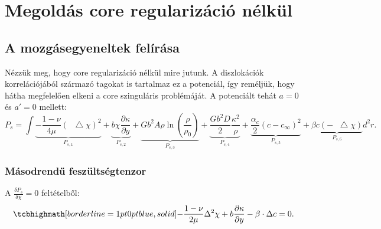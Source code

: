 \documentclass[10pt,a4paper]{scrartcl}
\newcommand*\Laplace{\mathop{}\!\mathbin\bigtriangleup}
\begin{document}
\section{Megoldás core regularizáció nélkül}
\subsection{A mozgásegyeneltek felírása}
Nézzük meg, hogy core regularizáció nélkül mire jutunk. A diszlokációk korrelációjából származó tagokat is tartalmaz ez a potenciál, így reméljük, hogy hátha megfelelően elkeni a core szinguláris problémáját. A potenciált tehát $a=0$ és $a'=0$ mellett:
\begin{equation} \label{eq:plastic_pot_wo_core_reg}
P_s = \int { \underbrace{- \frac{{1 - \nu }}{{4\mu }}{{\left( {\Laplace\chi } \right)}^2}}_{P_{s,1}} + \underbrace{b\chi \frac{{\partial \kappa }}{{\partial y}}}_{P_{s,2}} + \underbrace{G{b^2}A\rho \ln \left( {\frac{\rho }{{{\rho _0}}}} \right)}_{P_{s,3}} + \underbrace{\frac{{G{b^2}D}}{2}\frac{{{\kappa ^2}}}{\rho }}_{P_{s,4}} + \underbrace{\frac{\alpha_c}{2} {\left( {c - {c_\infty }} \right)^2}}_{P_{s,5}} + \underbrace{\beta c\left(- {\Laplace\chi } \right)}_{P_{s,6}}}{d^2}r.
\end{equation}
\subsubsection{Másodrendű feszültségtenzor}
A $\frac{{\delta {P_s}}}{{\delta \chi }} = 0$ feltételből:
\begin{equation} \label{eq:chi}
\tcbhighmath[borderline={1pt}{0pt}{blue,solid}]{- \frac{{1 - \nu }}{{2\mu }}{\Delta ^2}\chi  + b\frac{{\partial \kappa }}{{\partial y}} - \beta  \cdot \Delta c = 0.}
\end{equation}
\end{document}
